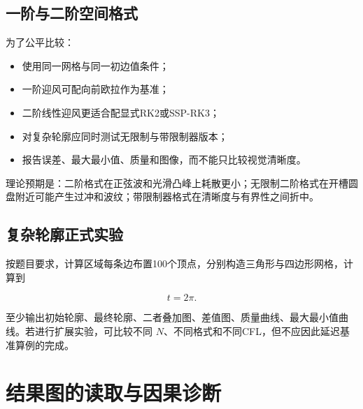 \documentclass[UTF8,12pt,a4paper,fontset=fandol]{ctexart}
\numberwithin{equation}{section}
\begin{document}
\subsection{一阶与二阶空间格式}

为了公平比较：

\begin{itemize}
  \item 使用同一网格与同一初边值条件；
  \item 一阶迎风可配向前欧拉作为基准；
  \item 二阶线性迎风更适合配显式RK2或SSP-RK3；
  \item 对复杂轮廓应同时测试无限制与带限制器版本；
  \item 报告误差、最大最小值、质量和图像，而不能只比较视觉清晰度。
\end{itemize}

理论预期是：二阶格式在正弦波和光滑凸峰上耗散更小；无限制二阶格式在开槽圆盘附近可能产生过冲和波纹；带限制器格式在清晰度与有界性之间折中。

\subsection{复杂轮廓正式实验}

按题目要求，计算区域每条边布置100个顶点，分别构造三角形与四边形网格，计算到

\begin{equation}
  t=2\pi.
\end{equation}

至少输出初始轮廓、最终轮廓、二者叠加图、差值图、质量曲线、最大最小值曲线。若进行扩展实验，可比较不同 $N$、不同格式和不同CFL，但不应因此延迟基准算例的完成。

\section{结果图的读取与因果诊断}
\end{document}
